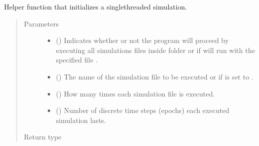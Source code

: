 \documentclass[letterpaper,10pt,english]{sphinxmanual}
\begin{document}

\begin{fulllineitems}
\label{\detokenize{app:app.hive_simulation._single_main}}
Helper function that initializes a single\sphinxhyphen{}threaded simulation.
\begin{quote}\begin{description}
\item[{Parameters}] \leavevmode\begin{itemize}
\item {} 
 () \textendash{} Indicates whether or not the program will proceed by executing
all simulations files inside
{\hyperref[\detokenize{app:app.environment_settings.SIMULATION_ROOT}]{}} folder or
if will run with the specified file .

\item {} 
 (\sphinxstyleliteralemphasis{\sphinxupquote{{[}}}\sphinxstyleliteralemphasis{\sphinxupquote{{]}}}) \textendash{} The name of the simulation file to be executed or  if
 is set to .

\item {} 
 () \textendash{} How many times each simulation file is executed.

\item {} 
 () \textendash{} Number of discrete time steps (epochs) each executed simulation
lasts.

\end{itemize}

\item[{Return type}] \leavevmode
{}

\end{description}\end{quote}

\end{fulllineitems}
\end{document}
